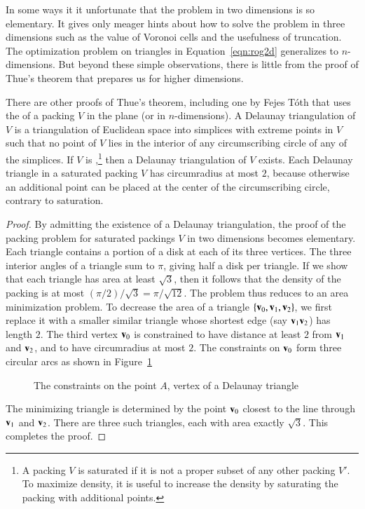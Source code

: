 In some ways it it unfortunate that the problem in two dimensions is
so elementary.  It gives only meager hints about how to solve the problem
in three dimensions such as the value of Voronoi cells
and the usefulness of truncation.  The optimization problem on
triangles in Equation~\ref{eqn:rog2d} generalizes to $n$-dimensions.
But beyond these simple observations, there is little from the proof of Thue's
theorem that prepares us for higher dimensions.


\bigskip

There are other proofs of Thue's theorem, including one by Fejes
T\'oth that uses the  of a packing $V$
in the plane (or in $n$-dimensions).  A Delaunay triangulation of $V$
is a triangulation of Euclidean space into simplices with extreme
points in $V$ such that no point of $V$ lies in the interior of any
circumscribing circle of any of the simplices.  If $V$ is
,\footnote{A packing $V$ is saturated if it is not
  a proper subset of any other packing $V'$.  To maximize density, it
  is useful to increase the density by saturating the packing with
  additional points.} then a Delaunay triangulation of
$V$ exists.  Each Delaunay triangle in a saturated packing $V$ has
circumradius at most $2$, because otherwise an additional point can be
placed at the center of the circumscribing circle, contrary to saturation.

\begin{proof}
  By admitting the existence of a Delaunay triangulation, the proof of
  the packing problem for saturated packings $V$ in two dimensions becomes
  elementary.  Each triangle contains a portion of a disk at each of
  its three vertices.  The three interior angles of a triangle sum to
  $\pi$, giving half a disk per triangle.  If we show that each triangle has area
  at least $\sqrt{3}$, then it follows that the density of the packing is at most
  $(\pi/2)/\sqrt{3} = \pi/\sqrt{12}$.  The problem thus reduces to
  an area minimization problem.  To decrease the area of a triangle
  $\{{\mathbf v}_0,{\mathbf v}_1,{\mathbf v}_2\}$, we first replace it with a smaller similar
  triangle whose shortest edge (say ${\mathbf v}_1{\mathbf v}_2$) has length $2$.  The
  third vertex ${\mathbf v}_0$ is constrained to have distance at least $2$
  from ${\mathbf v}_1$ and ${\mathbf v}_2$, and to have circumradius at most $2$.  The
  constraints on ${\mathbf v}_0$ form three circular arcs as shown in
  Figure~\ref{fig:2D-FT} %

\begin{figure}[htb]
  \centering
  \caption{The constraints on the point $A$, vertex of a Delaunay triangle}
  \label{fig:2D-FT}
\end{figure}

The minimizing triangle is determined by the point ${\mathbf v}_0$ closest to
the line through ${\mathbf v}_1$ and ${\mathbf v}_2$.  There are three such triangles,
each with area exactly $\sqrt3$.  This completes the proof.
\end{proof}

